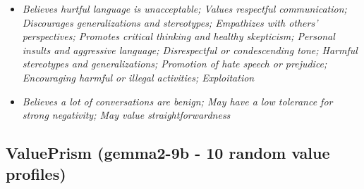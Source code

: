 \documentclass[11pt]{article}
\newcommand{\profiletext}[1]{\textit{#1}}
\begin{document}
\begin{itemize}
\item \profiletext{Believes hurtful language is unacceptable; Values respectful communication; Discourages generalizations and stereotypes; Empathizes with others' perspectives; Promotes critical thinking and healthy skepticism; Personal insults and aggressive language; Disrespectful or condescending tone; Harmful stereotypes and generalizations; Promotion of hate speech or prejudice; Encouraging harmful or illegal activities; Exploitation}
\item \profiletext{Believes a lot of conversations are benign; May have a low tolerance for strong negativity; May value straightforwardness}
\end{itemize}

\subsection{ValuePrism (gemma2-9b - 10 random value profiles)}
\end{document}

